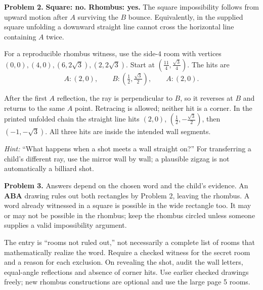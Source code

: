 \documentclass[11pt,letterpaper]{article}
\newcommand{\sectiontitle}[1]{\par\vspace{4pt}{\large\bfseries #1}\par}
\newcommand{\answer}[1]{\par\vspace{3pt}\textbf{Problem #1.} }
\begin{document}
\answer{2} \textbf{Square: no. Rhombus: yes.} The square impossibility follows from upward motion after $A$ surviving the $B$ bounce. Equivalently, in the supplied square unfolding a downward straight line cannot cross the horizontal line containing $A$ twice.

For a reproducible rhombus witness, use the side-$4$ room with vertices $(0,0),(4,0),(6,2\sqrt3),(2,2\sqrt3)$. Start at $(\frac{11}{4},\frac{\sqrt3}{4})$. The hits are
\[
 A:(2,0),\qquad B:(\tfrac12,\tfrac{\sqrt3}{2}),\qquad A:(2,0).
\]
\begin{center}
\end{center}
After the first $A$ reflection, the ray is perpendicular to $B$, so it reverses at $B$ and returns to the same $A$ point. Retracing is allowed; neither hit is a corner. In the printed unfolded chain the straight line hits $(2,0)$, $(\frac12,-\frac{\sqrt3}{2})$, then $(-1,-\sqrt3)$. All three hits are inside the intended wall segments.

\textit{Hint:} ``What happens when a shot meets a wall straight on?'' For transferring a child's different ray, use the mirror wall by wall; a plausible zigzag is not automatically a billiard shot.
\newpage
\sectiontitle{Secret-room play and the all-word conclusion}
\answer{3} Answers depend on the chosen word and the child's evidence. An \textbf{ABA} drawing rules out both rectangles by Problem 2, leaving the rhombus. A word already witnessed in a square is possible in the wide rectangle too. It may or may not be possible in the rhombus; keep the rhombus circled unless someone supplies a valid impossibility argument.

The entry is ``rooms not ruled out,'' not necessarily a complete list of rooms that mathematically realize the word. Require a checked witness for the secret room and a reason for each exclusion. On revealing the shot, audit the wall letters, equal-angle reflections and absence of corner hits. Use earlier checked drawings freely; new rhombus constructions are optional and use the large page 5 rooms.
\end{document}
